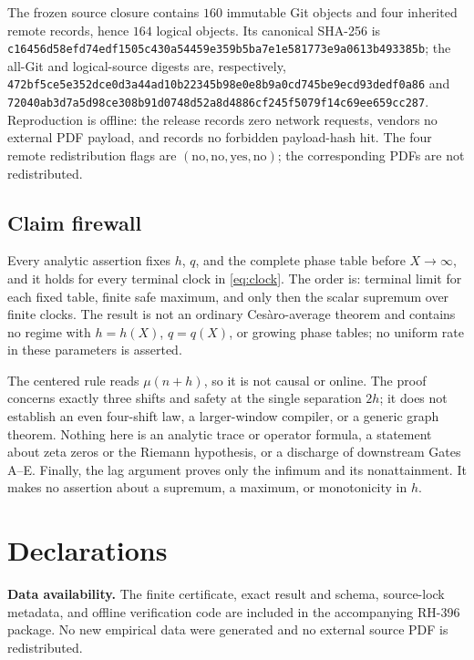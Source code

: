 \documentclass[11pt]{article}
\theoremstyle{definition}
\theoremstyle{remark}
\newcommand{\mob}{\mu}
\begin{document}
The frozen source closure contains \(160\) immutable Git objects and
four inherited remote records, hence \(164\) logical objects.  Its
canonical SHA-256 is
\nolinkurl{c16456d58efd74edf1505c430a54459e359b5ba7e1e581773e9a0613b493385b};
the all-Git and logical-source digests are, respectively,
\nolinkurl{472bf5ce5e352dce0d3a44ad10b22345b98e0e8b9a0cd745be9ecd93dedf0a86}
and
\nolinkurl{72040ab3d7a5d98ce308b91d0748d52a8d4886cf245f5079f14c69ee659cc287}.
Reproduction is offline: the release records zero network requests,
vendors no external PDF payload, and records no forbidden payload-hash
hit.  The four remote redistribution flags are
\((\mathrm{no},\mathrm{no},\mathrm{yes},\mathrm{no})\); the corresponding
PDFs are not redistributed.

\subsection{Claim firewall}

Every analytic assertion fixes \(h\), \(q\), and the complete phase
table before \(X\to\infty\), and it holds for every terminal clock in
\eqref{eq:clock}.  The order is: terminal limit for each fixed table,
finite safe maximum, and only then the scalar supremum over finite
clocks.  The result is not an ordinary Ces\`aro-average theorem and
contains no regime with \(h=h(X)\), \(q=q(X)\), or growing phase tables;
no uniform rate in these parameters is asserted.

The centered rule reads \(\mob(n+h)\), so it is not causal or online.
The proof concerns exactly three shifts and safety at the single
separation \(2h\); it does not establish an even four-shift law, a
larger-window compiler, or a generic graph theorem.  Nothing here is an
analytic trace or operator formula, a statement about zeta zeros or the
Riemann hypothesis, or a discharge of downstream Gates A--E.  Finally,
the lag argument proves only the infimum and its nonattainment.  It
makes no assertion about a supremum, a maximum, or monotonicity in
\(h\).

\section*{Declarations}

\noindent\textbf{Data availability.}
The finite certificate, exact result and schema, source-lock metadata, and
offline verification code are included in the accompanying RH-396 package.
No new empirical data were generated and no external source PDF is
redistributed.
\end{document}
